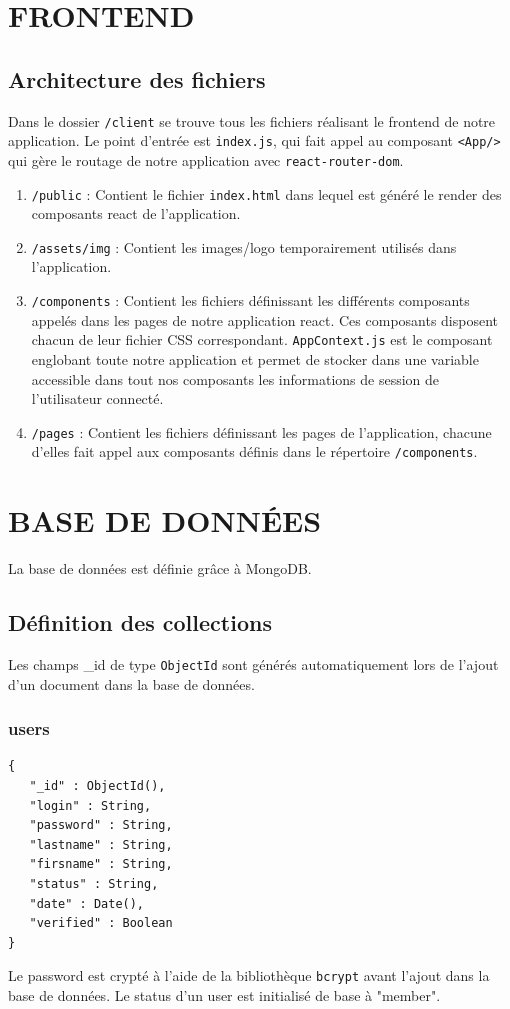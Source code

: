 \documentclass{article}
\begin{document}
\newpage

\section{FRONTEND}

\subsection*{Architecture des fichiers}
Dans le dossier \texttt{/client} se trouve tous les fichiers réalisant le frontend de notre application. Le point d'entrée est \texttt{index.js}, qui fait appel au composant \texttt{<App/>} qui gère le routage de notre application avec \texttt{react-router-dom}.

\begin{enumerate}
    \item \texttt{/public} : Contient le fichier \texttt{index.html} dans lequel est généré le render des composants react de l'application.
    \item \texttt{/assets/img} : Contient les images/logo temporairement utilisés dans l'application.
    \item \texttt{/components} : Contient les fichiers définissant les différents composants appelés dans les pages de notre application react. Ces composants disposent chacun de leur fichier CSS correspondant. \texttt{AppContext.js} est le composant englobant toute notre application et permet de stocker dans une variable accessible dans tout nos composants les informations de session de l'utilisateur connecté.
    \item \texttt{/pages} : Contient les fichiers définissant les pages de l'application, chacune d'elles fait appel aux composants définis dans le répertoire \texttt{/components}.
\end{enumerate}

\section{BASE DE DONNÉES}
La base de données est définie grâce à MongoDB.

\subsection*{Définition des collections}
Les champs \_id de type \texttt{ObjectId} sont générés automatiquement lors de l'ajout d'un document dans la base de données.

\subsubsection*{users}
\begin{verbatim}
{
   "_id" : ObjectId(),
   "login" : String,
   "password" : String,
   "lastname" : String,
   "firsname" : String,
   "status" : String,
   "date" : Date(),
   "verified" : Boolean
}
\end{verbatim}
Le password est crypté à l'aide de la bibliothèque \texttt{bcrypt} avant l'ajout dans la base de données. Le status d'un user est initialisé de base à "member".
\end{document}
